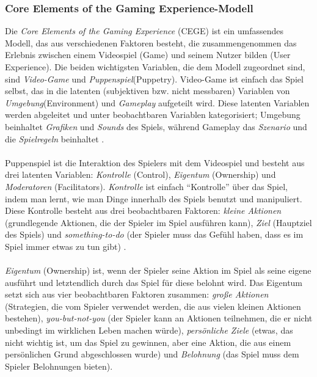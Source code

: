 \documentclass[a4paper,12pt,twoside]{scrartcl}
\begin{document}
\subsubsection{Core Elements of the Gaming Experience-Modell}
Die \textit{Core Elements of the Gaming Experience} (CEGE) ist ein umfassendes Modell, das aus verschiedenen Faktoren besteht, die zusammengenommen das Erlebnis zwischen einem Videospiel (Game) und seinem Nutzer bilden (User Experience).  Die beiden wichtigsten Variablen, die dem Modell zugeordnet sind, sind \textit{Video-Game} und \textit{Puppenspiel}(Puppetry). Video-Game ist einfach das Spiel selbst, das in die latenten (subjektiven bzw. nicht messbaren) Variablen von \textit{Umgebung}(Environment) und \textit{Gameplay} aufgeteilt wird. Diese latenten Variablen werden abgeleitet und unter beobachtbaren Variablen kategorisiert; Umgebung beinhaltet \textit{Grafiken} und \textit{Sounds} des Spiels, während Gameplay das \textit{Szenario} und die \textit{Spielregeln} beinhaltet \cite{CEGE2016}.
\\\\
Puppenspiel ist die Interaktion des Spielers mit dem Videospiel und besteht aus drei latenten Variablen: \textit{Kontrolle} (Control), \textit{Eigentum} (Ownership) und \textit{Moderatoren} (Facilitators). \textit{Kontrolle} ist einfach \enquote{Kontrolle} über das Spiel, indem man lernt, wie man Dinge innerhalb des Spiels benutzt und manipuliert. Diese Kontrolle besteht aus drei beobachtbaren Faktoren: \textit{kleine Aktionen} (grundlegende Aktionen, die der Spieler im Spiel ausführen kann), \textit{Ziel} (Hauptziel des Spiels) und \textit{something-to-do} (der Spieler muss das Gefühl haben, dass es im Spiel immer etwas zu tun gibt) \cite{CEGE2016}. 
\\\\
\textit{Eigentum} (Ownership) ist, wenn der Spieler seine Aktion im Spiel als seine eigene ausführt und letztendlich durch das Spiel für diese belohnt wird. Das Eigentum setzt sich aus vier beobachtbaren Faktoren zusammen: \textit{große Aktionen} (Strategien, die vom Spieler verwendet werden, die aus vielen kleinen Aktionen bestehen), \textit{you-but-not-you} (der Spieler kann an Aktionen teilnehmen, die er nicht unbedingt im wirklichen Leben machen würde), \textit{persönliche Ziele} (etwas, das nicht wichtig ist, um das Spiel zu gewinnen, aber eine Aktion, die aus einem persönlichen Grund abgeschlossen wurde) und \textit{Belohnung} (das Spiel muss dem Spieler Belohnungen bieten)\cite{CEGE2016}. 
\\\\
\end{document}
